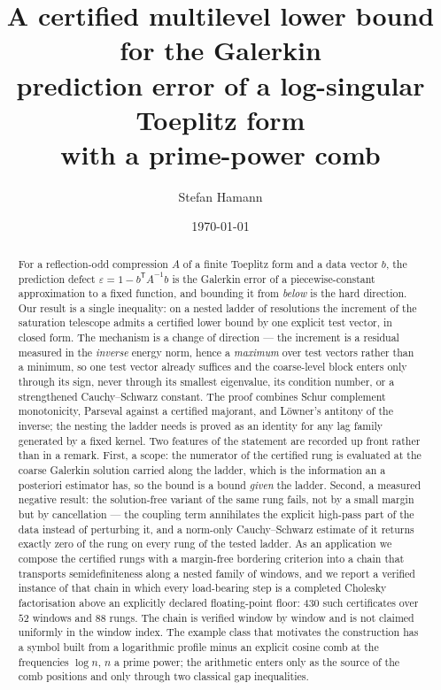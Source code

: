 \documentclass[11pt,a4paper]{article}
\title{A certified multilevel lower bound for the Galerkin\\
prediction error of a log-singular Toeplitz form\\
with a prime-power comb}
\author{Stefan Hamann}
\date{\today}
\theoremstyle{plain}
\theoremstyle{definition}
\newcommand{\T}{\mathsf{T}}
\begin{document}
\maketitle

\begin{abstract}
\noindent
For a reflection-odd compression $A$ of a finite Toeplitz form and a data vector $b$,
the prediction defect $\varepsilon=1-b^{\T}A^{-1}b$ is the Galerkin error of a
piecewise-constant approximation to a fixed function, and bounding it from
\emph{below} is the hard direction. Our result is a single inequality: on a nested
ladder of resolutions the increment of the saturation telescope admits a certified
lower bound by one explicit test vector, in closed form. The mechanism is a change of
direction --- the increment is a residual measured in the \emph{inverse} energy norm,
hence a \emph{maximum} over test vectors rather than a minimum, so one test vector
already suffices and the coarse-level block enters only through its sign, never
through its smallest eigenvalue, its condition number, or a strengthened
Cauchy--Schwarz constant. The proof combines Schur complement monotonicity, Parseval
against a certified majorant, and L\"owner's antitony of the inverse; the nesting the
ladder needs is proved as an identity for any lag family generated by a fixed kernel.
Two features of the statement are recorded up front rather than in a remark. First, a
scope: the numerator of the certified rung is evaluated at the coarse Galerkin
solution carried along the ladder, which is the information an a posteriori estimator
has, so the bound is a bound \emph{given} the ladder. Second, a measured negative
result: the solution-free variant of the same rung fails, not by a small margin but by
cancellation --- the coupling term annihilates the explicit high-pass part of the data
instead of perturbing it, and a norm-only Cauchy--Schwarz estimate of it returns
exactly zero of the rung on every rung of the tested ladder. As an application we
compose the certified rungs with a margin-free bordering criterion into a chain that
transports semidefiniteness along a nested family of windows, and we report a verified
instance of that chain in which every load-bearing step is a completed Cholesky
factorisation above an explicitly declared floating-point floor: $430$ such
certificates over $52$ windows and $88$ rungs. The chain is verified window by window
and is not claimed uniformly in the window index. The example class that motivates the
construction has a symbol built from a logarithmic profile minus an explicit cosine
comb at the frequencies $\log n$, $n$ a prime power; the arithmetic enters only as the
source of the comb positions and only through two classical gap inequalities.
\end{abstract}
\end{document}
